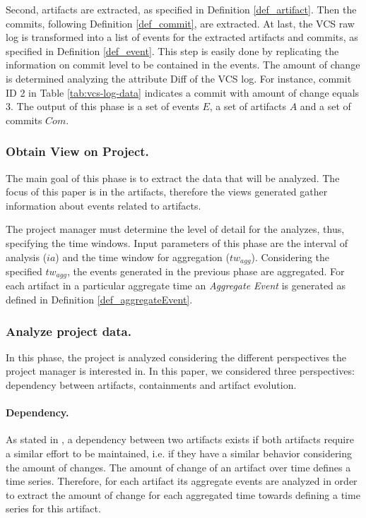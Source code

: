 Second, artifacts are extracted, as specified in Definition \ref{def_artifact}. Then the commits, following Definition \ref{def_commit}, are extracted. At last, the VCS raw log is transformed into a list of events for the extracted artifacts and commits, as specified in Definition \ref{def_event}. This step is easily done by replicating the information on commit level to be contained in the events. The amount of change is determined analyzing the attribute Diff of the VCS log. For instance, commit ID 2 in Table \ref{tab:vcs-log-data} indicates a commit with amount of change equals 3. The output of this phase is a set of events $E$, a set of artifacts $A$ and a set of commits $Com$.

\subsubsection{Obtain View on Project.}
The main goal of this phase is to extract the data that will be analyzed. The focus of this paper is in the artifacts, therefore the views generated gather information about events related to artifacts.  

The project manager must determine the level of detail for the analyzes, thus, specifying the time windows. Input parameters of this phase are the interval of analysis ($ia$) and the time window for aggregation ($tw_{agg}$). Considering the specified $tw_{agg}$, the events generated in the previous phase are aggregated. For each artifact in a particular aggregate time an \emph{Aggregate Event} is generated as defined in Definition \ref{def_aggregateEvent}.

\subsubsection{Analyze project data.}
In this phase, the project is analyzed considering the different perspectives the project manager is interested in. In this paper, we considered three perspectives: dependency between artifacts, containments and artifact evolution.

\paragraph{Dependency.} As stated in , a dependency between two artifacts exists if both artifacts require a similar effort to be maintained, i.e. if they have a similar behavior considering the amount of changes.  The amount of change of an artifact over time defines  a time series. Therefore, for each artifact its aggregate events are analyzed in order to extract the amount of change for each aggregated time towards defining a time series for this artifact. 

